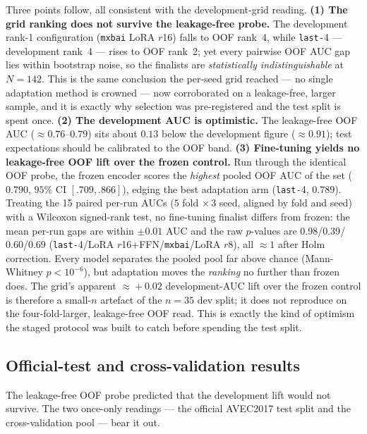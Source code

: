 Three points follow, all consistent with the development-grid reading.
\textbf{(1) The grid ranking does not survive the leakage-free probe.} The
development rank-1 configuration (\texttt{mxbai} LoRA $r$16) falls to OOF rank~4,
while \texttt{last-}4 --- development rank~4 --- rises to OOF rank~2; yet every
pairwise OOF AUC gap lies within bootstrap noise, so the finalists are
\emph{statistically indistinguishable} at $N\!=\!142$. This is the same
conclusion the per-seed grid reached --- no single adaptation method is crowned
--- now corroborated on a leakage-free, larger sample, and it is
exactly why selection was pre-registered and the test split is spent once.
\textbf{(2) The development AUC is optimistic.} The leakage-free OOF AUC
($\approx\!0.76$--$0.79$) sits about $0.13$ below the development figure
($\approx\!0.91$); test expectations should be calibrated to the OOF band.
\textbf{(3) Fine-tuning yields no leakage-free OOF lift over the frozen
control.} Run through the identical OOF probe, the frozen encoder scores the
\emph{highest} pooled OOF AUC of the set ($0.790$, $95\%$ CI $[.709,.866]$),
edging the best adaptation arm (\texttt{last-}4, $0.789$). Treating the 15 paired
per-run AUCs ($5$ fold $\times\,3$ seed, aligned by fold and seed) with a
Wilcoxon signed-rank test, no fine-tuning finalist differs from frozen: the
mean per-run gaps are within $\pm0.01$ AUC and the raw $p$-values are
$0.98$/$0.39$/$0.60$/$0.69$ (\texttt{last-}4/LoRA $r$16+FFN/\texttt{mxbai}/LoRA
$r$8), all $\approx\!1$ after Holm correction. Every model separates the pooled
pool far above chance (Mann-Whitney $p<10^{-6}$), but adaptation moves the
\emph{ranking} no further than frozen does. The grid's apparent $\approx\!+0.02$
development-AUC lift over the frozen control is therefore a small-$n$ artefact of
the $n\!=\!35$ dev split; it does not reproduce on the four-fold-larger,
leakage-free OOF read. This is exactly the kind of optimism the staged protocol
was built to catch before spending the test split.

\subsection{Official-test and cross-validation results}
\label{sec:finetune-iter1-test}

The leakage-free OOF probe predicted that the development lift would not survive.
The two once-only readings --- the official AVEC2017 test split and the
cross-validation pool --- bear it out.

